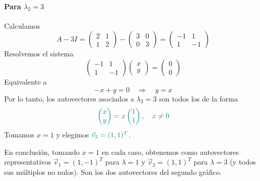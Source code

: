 \documentclass{article}
\newcommand{\vect}[1]{\vec{#1}}
\begin{document}
\paragraph*{Para \(\lambda_2 = 3\)}
Calculamos
\[
A - 3I = \begin{pmatrix}
 2 & 1\\
 1 & 2
\end{pmatrix}
- \begin{pmatrix}
 3 & 0\\
 0 & 3
\end{pmatrix}
= \begin{pmatrix}
 -1 & 1\\
 1 & -1
\end{pmatrix}
\]
Resolvemos el sistema
\[
\begin{pmatrix}
 -1 & 1\\
 1 & -1
\end{pmatrix}
\begin{pmatrix}x\\y\end{pmatrix}
= \begin{pmatrix}0\\0\end{pmatrix}
\]
Equivalente a
\[
-x + y = 0
\quad\Longrightarrow\quad
y = x
\]
Por lo tanto, los autovectores asociados a \(\lambda_2=3\) son todos los de la forma
\[\color{teal}
\begin{pmatrix}x\\y\end{pmatrix}
= x\begin{pmatrix}1\\1\end{pmatrix},
\quad x\neq 0
\]
Tomamos \(x=1\) y elegimos \(\color{teal}\vect{v}_2 = (1,1)^T\).

En conclusión, tomando \(x=1\) en cada caso, obtenemos como autovectores representativos \(\vect{v}_1=(1,-1)^T\) para \(\lambda=1\) y \(\vect{v}_2=(1,1)^T\) para \(\lambda=3\) (y todos sus múltiplos no nulos). Son los dos autovectores del segundo gráfico.
\end{document}
